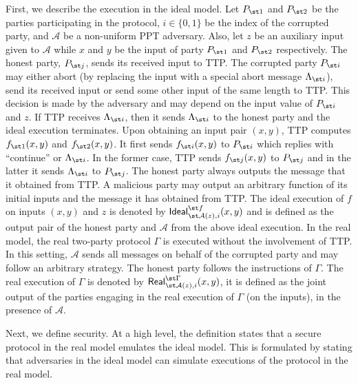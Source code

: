 First, we describe the execution in the ideal model. Let $P_{\st 1}$ and $P_{\st 2}$ be the parties participating in the
protocol, $i\in \{0, 1\}$ be the index of the corrupted party, and $\mathcal A$ be a non-uniform
PPT adversary. Also, let $z$ be an auxiliary input given to $\mathcal A$ while  $x$ and $y$ be the input of party $P_{\st 1}$ and $P_{\st 2}$  respectively.  The honest party, $P_{\st j}$, sends its received input to TTP.  The corrupted party $P_{\st i}$ may either abort (by replacing the input with a special abort message $\Lambda_{\st i}$),  send its received input or send some other input of the same length to TTP. This decision is made by the adversary and may depend on the input value of $P_{\st i}$ and $z$. If TTP receives $\Lambda_{\st i}$, then it sends $\Lambda_{\st i}$ to the honest party and the ideal execution terminates.  Upon obtaining an input pair $(x, y)$, TTP computes $f_{\st 1}(x, y)$ and $f_{\st 2}(x, y)$. It first sends $f_{\st i}(x, y)$ to  $P_{\st i}$ which replies with ``continue'' or $\Lambda_{\st i}$. In the former case, TTP sends  $f_{\st j}(x, y)$ to  $P_{\st j}$ and in the latter it sends $\Lambda_{\st i}$ to  $P_{\st j}$. The honest party always outputs the message that it obtained from TTP. A malicious party may output an arbitrary function of its initial inputs and the message it has obtained from TTP.  The ideal execution of $f$ on inputs $(x, y)$ and $z$ is denoted by $\mathsf{Ideal}^{\st f}_{\st\mathcal{A}(z), i}(x,y)$ and is defined as the output pair of the honest party and $\mathcal{A}$ from the above ideal execution.  In the real model, the real two-party protocol $\Gamma$ is executed
without the involvement of TTP. In this setting, $\mathcal{A}$ sends all messages on
behalf of the corrupted party and may follow an arbitrary strategy.
The honest party follows the instructions of $\Gamma$. The real execution of $\Gamma$ is denoted by $\mathsf{Real}^{\st \Gamma}_{\st\mathcal{A}(z), i}(x,y)$, it is defined as the joint output of the parties engaging in the real execution of $\Gamma$ (on the inputs), in the presence of $\mathcal{A}$.
 
 
 Next, we define security. At a high level, the definition states that a secure protocol in the real model emulates the ideal model. This is formulated by stating that adversaries in the ideal model can simulate executions of the protocol in the real model. 
 
